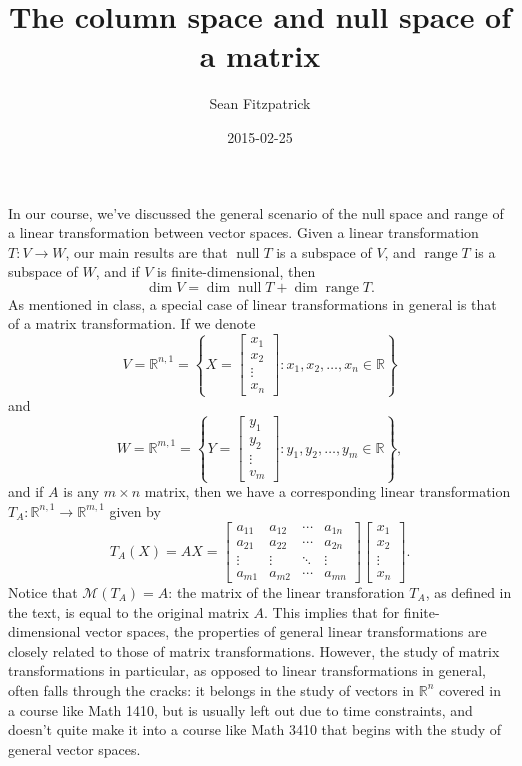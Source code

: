 \documentclass[letterpaper,12pt]{article}
\author{Sean Fitzpatrick}
\date{2015-02-25}
\title{The column space and null space of a matrix}
\newcommand{\R}{\mathbb{R}}
\DeclareMathOperator{\nul}{null}
\DeclareMathOperator{\range}{range}
\begin{document}
\maketitle

In our course, we've discussed the general scenario of the null space and range of a linear transformation between vector spaces. Given a linear transformation $T:V\to W$, our main results are that $\nul T$ is a subspace of $V$, and $\range T$ is a subspace of $W$, and if $V$ is finite-dimensional, then
\[
 \dim V = \dim \nul T + \dim \range T.
\]
As mentioned in class, a special case of linear transformations in general is that of a matrix transformation. If we denote
\[
 V = \R^{n,1} = \left\{X=\begin{bmatrix}x_1\\x_2\\\vdots\\x_n\end{bmatrix} : x_1,x_2,\ldots, x_n\in\R\right\}
\]
and 
\[
W = \R^{m,1} = \left\{Y=\begin{bmatrix}y_1\\y_2\\\vdots\\v_m\end{bmatrix} : y_1,y_2,\ldots, y_m\in\R\right\},
\]
and if $A$ is any $m\times n$ matrix, then we have a corresponding linear transformation $T_A:\R^{n,1}\to\R^{m,1}$ given by
\[
 T_A(X) = AX = \begin{bmatrix}a_{11}&a_{12}&\cdots & a_{1n}\\
                a_{21}&a_{22}&\cdots&a_{2n}\\
		\vdots & \vdots & \ddots & \vdots\\
		a_{m1} & a_{m2} & \cdots & a_{mn}
               \end{bmatrix}\begin{bmatrix}x_1\\x_2\\\vdots\\x_n\end{bmatrix}.
\]
Notice that $\mathcal{M}(T_A) = A$: the matrix of the linear transforation $T_A$, as defined in the text, is equal to the original matrix $A$. This implies that for finite-dimensional vector spaces, the properties of general linear transformations are closely related to those of matrix transformations. However, the study of matrix transformations in particular, as opposed to linear transformations in general, often falls through the cracks: it belongs in the study of vectors in $\mathbb{R}^n$ covered in a course like Math 1410, but is usually left out due to time constraints, and doesn't quite make it into a course like Math 3410 that begins with the study of general vector spaces.
\end{document}
